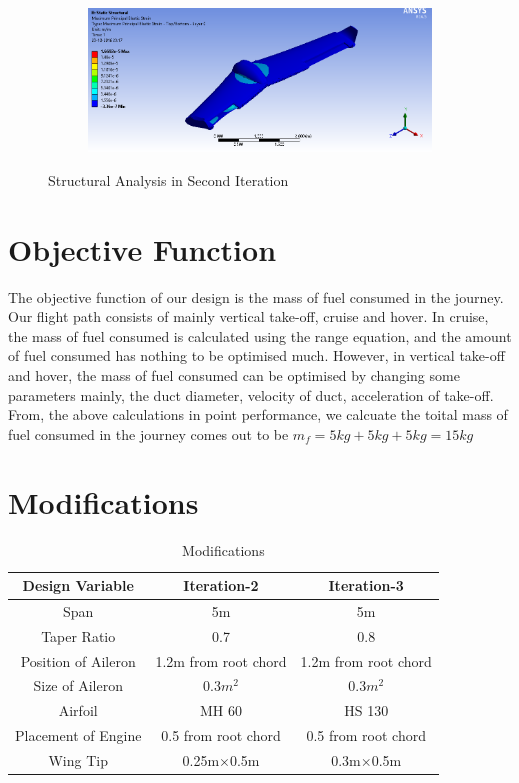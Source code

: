 \begin{figure}[H]
\begin{subfigure}{0.48\textwidth}
\end{subfigure}
\begin{subfigure}{0.48\textwidth}
\includegraphics[width = \linewidth]{iter2_max_strain.png}
\end{subfigure}
\caption{Structural Analysis in Second Iteration}
\end{figure}
\section{Objective Function}
The objective function of our design is the mass of fuel consumed in the journey. Our flight path consists of mainly vertical take-off, cruise and hover. 
In cruise, the mass of fuel consumed is calculated using the range equation, and the amount of fuel consumed has nothing to be optimised much. However, in vertical take-off and hover, the mass of fuel
consumed can be optimised by changing some parameters mainly, the duct diameter, velocity of duct, acceleration of take-off.
From, the above calculations in point performance, we calcuate the toital mass of fuel consumed in the journey comes out to be
$m_f = 5kg + 5kg + 5kg = 15kg $ 
\section{Modifications}
\begin{table}[H]
\begin{center}
\begin{tabular}{ |c| c| c| }
\hline
 Design Variable & Iteration-2 & Iteration-3 \\ 
 \hline
 Span & 5m & 5m \\ 
 \hline
 Taper Ratio & 0.7 & 0.8 \\ 
 \hline
 Position of Aileron & 1.2m from root chord & 1.2m from root chord \\
 \hline
 Size of Aileron & 0.3$m^2$ & 0.3$m^2$ \\
 \hline
 Airfoil & MH 60 & HS 130 \\
 \hline
 Placement of Engine & 0.5 from root chord & 0.5 from root chord \\
 \hline
 Wing Tip & 0.25m$\times$0.5m & 0.3m$\times$0.5m \\
 \hline
\end{tabular}
\end{center}
\caption{Modifications}
\end{table}

